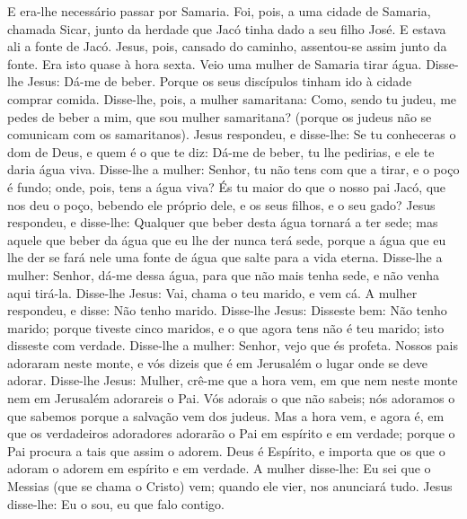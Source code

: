 E era-lhe necessário passar por Samaria. Foi, pois, a uma
cidade de Samaria, chamada Sicar, junto da herdade que Jacó tinha
dado a seu filho José. E estava ali a fonte de Jacó. Jesus,
pois, cansado do caminho, assentou-se assim junto da fonte. Era isto
quase à hora sexta. Veio uma mulher de Samaria tirar água.
Disse-lhe Jesus: Dá-me de beber. Porque os seus discípulos
tinham ido à cidade comprar comida. Disse-lhe, pois, a mulher
samaritana: Como, sendo tu judeu, me pedes de beber a mim, que sou
mulher samaritana? (porque os judeus não se comunicam com os
samaritanos). Jesus respondeu, e disse-lhe: Se tu conheceras
o dom de Deus, e quem é o que te diz: Dá-me de beber, tu lhe
pedirias, e ele te daria água viva. Disse-lhe a mulher:
Senhor, tu não tens com que a tirar, e o poço é fundo; onde, pois,
tens a água viva? És tu maior do que o nosso pai Jacó, que
nos deu o poço, bebendo ele próprio dele, e os seus filhos, e o seu
gado? Jesus respondeu, e disse-lhe: Qualquer que beber desta
água tornará a ter sede; mas aquele que beber da água que eu
lhe der nunca terá sede, porque a água que eu lhe der se fará nele
uma fonte de água que salte para a vida eterna. Disse-lhe a
mulher: Senhor, dá-me dessa água, para que não mais tenha sede, e
não venha aqui tirá-la. Disse-lhe Jesus: Vai, chama o teu
marido, e vem cá. A mulher respondeu, e disse: Não tenho
marido. Disse-lhe Jesus: Disseste bem: Não tenho marido;
porque tiveste cinco maridos, e o que agora tens não é teu
marido; isto disseste com verdade. Disse-lhe a mulher:
Senhor, vejo que és profeta. Nossos pais adoraram neste
monte, e vós dizeis que é em Jerusalém o lugar onde se deve adorar.
Disse-lhe Jesus: Mulher, crê-me que a hora vem, em que nem
neste monte nem em Jerusalém adorareis o Pai. Vós adorais o
que não sabeis; nós adoramos o que sabemos porque a salvação vem dos
judeus. Mas a hora vem, e agora é, em que os verdadeiros
adoradores adorarão o Pai em espírito e em verdade; porque o Pai
procura a tais que assim o adorem. Deus é Espírito, e importa
que os que o adoram o adorem em espírito e em verdade. A
mulher disse-lhe: Eu sei que o Messias (que se chama o Cristo) vem;
quando ele vier, nos anunciará tudo. Jesus disse-lhe: Eu o
sou, eu que falo contigo.

